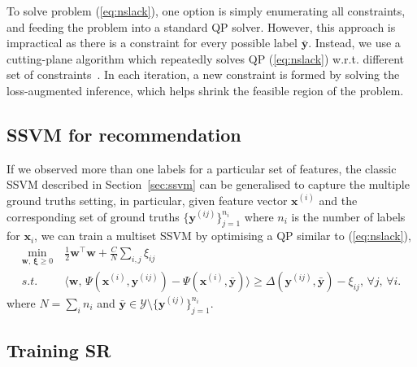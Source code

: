 To solve problem (\ref{eq:nslack}), one option is simply enumerating all constraints, and feeding the problem into a standard QP solver.
However, this approach is impractical as there is a constraint for every possible label $\bar{\mathbf{y}}$.
Instead, we use a cutting-plane algorithm which repeatedly solves QP (\ref{eq:nslack}) 
w.r.t. different set of constraints~\cite{joachims2009predicting}.
In each iteration, a new constraint is formed by solving the loss-augmented inference, 
which helps shrink the feasible region of the problem.


\subsection{SSVM for recommendation}
\label{ssec:sr}


If we observed more than one labels for a particular set of features, 
the classic SSVM described in Section~\ref{sec:ssvm} can be generalised to capture the multiple ground truths setting,
in particular, given feature vector $\mathbf{x}^{(i)}$ and the corresponding set of ground truths $\{\mathbf{y}^{(ij)}\}_{j=1}^{n_i}$ 
where $n_i$ is the number of labels for $\mathbf{x}_i$,
we can train a multiset SSVM by optimising a QP similar to (\ref{eq:nslack}),
\begin{equation}
\label{eq:nslack_ml}
\begin{aligned}
\min_{\mathbf{w}, \, \bm{\xi} \ge 0} ~& \frac{1}{2} \mathbf{w}^\top \mathbf{w} + \frac{C}{N} \sum_{i,j} \xi_{ij} \\
s.t.~ ~& \langle \mathbf{w}, \, \Psi(\mathbf{x}^{(i)}, \mathbf{y}^{(ij)}) - \Psi(\mathbf{x}^{(i)}, \bar{\mathbf{y}}) \rangle \ge 
         \Delta(\mathbf{y}^{(ij)}, \bar{\mathbf{y}}) - \xi_{ij}, \, \forall j, \, \forall i.
\end{aligned}
\end{equation}
where $N = \sum_i n_i$ and $\bar{\mathbf{y}} \in \mathcal{Y} \setminus \{\mathbf{y}^{(ij)}\}_{j=1}^{n_i}$.



\subsection{Training SR}
\label{sec:SRtrain}


